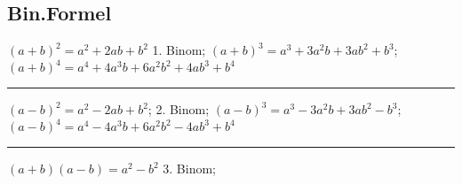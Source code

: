 \subsection{Bin.Formel}
$ (a + b)^2 = a^2 + 2ab + b^2 $ 1. Binom;
$ (a+b)^3 = a^3 + 3a^2b + 3ab^2 + b^3 $; 
$ (a+b)^4 = a^4 + 4a^3b + 6a^2b^2 + 4ab^3 + b^4$
\hrule
$ (a-b)^2 = a^2 - 2ab + b^2 $; 2. Binom;
$ (a-b)^3 = a^3 - 3a^2b + 3ab^2 - b^3$; 
$ (a-b)^4 = a^4 - 4a^3b + 6a^2b^2 - 4ab^3 + b^4 $
\hrule
$ (a+b) (a-b) = a^2 - b^2 $ 3. Binom; 

